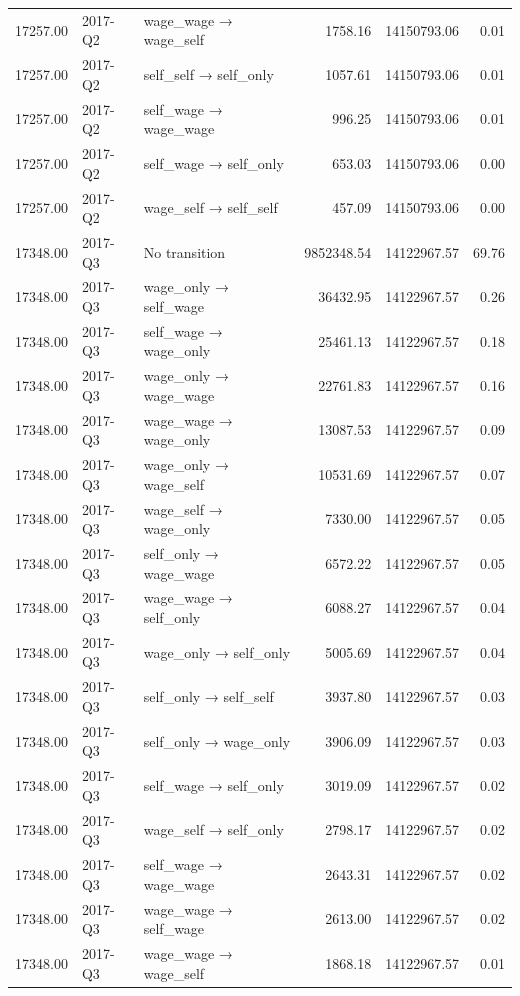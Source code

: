 \begin{table}[ht]
{\begin{tabular}{rllrrr}
  17257.00 & 2017-Q2 & wage\_wage → wage\_self & 1758.16 & 14150793.06 & 0.01 \\ 
  17257.00 & 2017-Q2 & self\_self → self\_only & 1057.61 & 14150793.06 & 0.01 \\ 
  17257.00 & 2017-Q2 & self\_wage → wage\_wage & 996.25 & 14150793.06 & 0.01 \\ 
  17257.00 & 2017-Q2 & self\_wage → self\_only & 653.03 & 14150793.06 & 0.00 \\ 
  17257.00 & 2017-Q2 & wage\_self → self\_self & 457.09 & 14150793.06 & 0.00 \\ 
  17348.00 & 2017-Q3 & No transition & 9852348.54 & 14122967.57 & 69.76 \\ 
  17348.00 & 2017-Q3 & wage\_only → self\_wage & 36432.95 & 14122967.57 & 0.26 \\ 
  17348.00 & 2017-Q3 & self\_wage → wage\_only & 25461.13 & 14122967.57 & 0.18 \\ 
  17348.00 & 2017-Q3 & wage\_only → wage\_wage & 22761.83 & 14122967.57 & 0.16 \\ 
  17348.00 & 2017-Q3 & wage\_wage → wage\_only & 13087.53 & 14122967.57 & 0.09 \\ 
  17348.00 & 2017-Q3 & wage\_only → wage\_self & 10531.69 & 14122967.57 & 0.07 \\ 
  17348.00 & 2017-Q3 & wage\_self → wage\_only & 7330.00 & 14122967.57 & 0.05 \\ 
  17348.00 & 2017-Q3 & self\_only → wage\_wage & 6572.22 & 14122967.57 & 0.05 \\ 
  17348.00 & 2017-Q3 & wage\_wage → self\_only & 6088.27 & 14122967.57 & 0.04 \\ 
  17348.00 & 2017-Q3 & wage\_only → self\_only & 5005.69 & 14122967.57 & 0.04 \\ 
  17348.00 & 2017-Q3 & self\_only → self\_self & 3937.80 & 14122967.57 & 0.03 \\ 
  17348.00 & 2017-Q3 & self\_only → wage\_only & 3906.09 & 14122967.57 & 0.03 \\ 
  17348.00 & 2017-Q3 & self\_wage → self\_only & 3019.09 & 14122967.57 & 0.02 \\ 
  17348.00 & 2017-Q3 & wage\_self → self\_only & 2798.17 & 14122967.57 & 0.02 \\ 
  17348.00 & 2017-Q3 & self\_wage → wage\_wage & 2643.31 & 14122967.57 & 0.02 \\ 
  17348.00 & 2017-Q3 & wage\_wage → self\_wage & 2613.00 & 14122967.57 & 0.02 \\ 
  17348.00 & 2017-Q3 & wage\_wage → wage\_self & 1868.18 & 14122967.57 & 0.01 \\ 

\end{tabular}}
\end{table}
